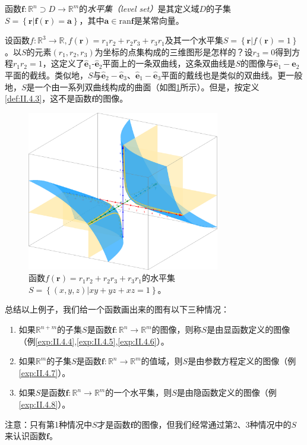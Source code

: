 \documentclass[main.tex]{subfiles}
\begin{document}
\begin{definition}[函数的水平集]\label{def:II.4.4}
    函数$\mathbf{f}:\mathbb{R}^n\supset D\rightarrow\mathbb{R}^m$的\emph{水平集（level set）}是其定义域$D$的子集$S=\left\{\mathbf{r}|\mathbf{f}\left(\mathbf{r}\right)=\mathbf{a}\right\}$，其中$\mathbf{a}\in\mathrm{ran}\mathbf{f}$是某常向量\cite[\S7.1]{华工高数2009下}。
\end{definition}
\begin{example}\label{exp:II.4.8}
    设函数$f:\mathbb{R}^3\rightarrow\mathbb{R},f\left(\mathbf{r}\right)=r_1r_2+r_2r_3+r_3r_1$及其一个水平集$S=\left\{\mathbf{r}|f\left(\mathbf{r}\right)=1\right\}$。以$S$的元素$\left(r_1,r_2,r_3\right)$为坐标的点集构成的三维图形是怎样的？设$r_3=0$得到方程$r_1r_2=1$，这定义了$\mathbf{\hat{e}}_1$-$\mathbf{\hat{e}}_2$平面上的一条双曲线，这条双曲线是$S$的图像与$\mathbf{\hat{e}}_1-\mathbf{\hat{e}}_2$平面的截线。类似地，$S$与$\mathbf{\hat{e}}_2-\mathbf{\hat{e}}_3$、$\mathbf{\hat{e}}_1-\mathbf{\hat{e}}_3$平面的戴线也是类似的双曲线。更一般地，$S$是一个由一系列双曲线构成的曲面（如图\ref{fig:II.4.5}所示）。但是，按定义\ref{def:II.4.3}，这不是函数$\mathbf{f}$的图像。
\end{example}
\begin{figure}[h]
    \centering
    \includegraphics[width=0.75\textwidth]{images/II.4.5.png}
    \caption{函数$f\left(\mathbf{r}\right)=r_1r_2+r_2r_3+r_3r_1$的水平集$S=\left\{\left(x,y,z\right)|xy+yz+xz=1\right\}$。}
    \label{fig:II.4.5}
\end{figure}
总结以上例子，我们给一个函数画出来的图有以下三种情况：
\begin{enumerate}
    \item 如果$\mathbb{R}^{n+m}$的子集$S$是函数$\mathbf{f}:\mathbb{R}^n\rightarrow\mathbb{R}^m$的图像，则称$S$是由显函数定义的图像（例\ref{exp:II.4.4},\ref{exp:II.4.5},\ref{exp:II.4.6}）。
    \item 如果$\mathbb{R}^{m}$的子集$S$是函数$\mathbf{f}:\mathbb{R}^n\rightarrow\mathbb{R}^m$的值域，则$S$是由参数方程定义的图像（例\ref{exp:II.4.7}）。
    \item 如果$S$是函数$\mathbf{f}:\mathbb{R}^n\rightarrow\mathbb{R}^m$的一个水平集，则$S$是由隐函数定义的图像（例\ref{exp:II.4.8}）。
\end{enumerate}

注意：只有第1种情况中$S$才是函数$\mathbf{f}$的图像，但我们经常通过第2、3种情况中的$S$来认识函数$\mathbf{f}$。
\end{document}
